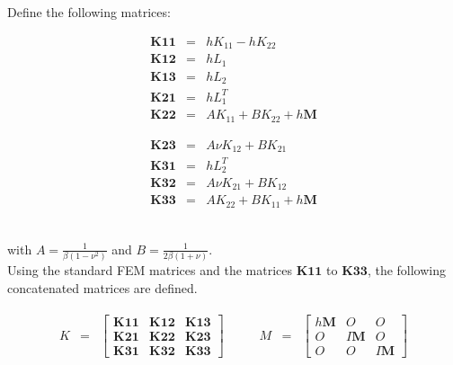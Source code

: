 \documentclass[../../main.tex]{subfiles}
\begin{document}
Define the following matrices:\\
\noindent\begin{minipage}{.5\linewidth}
	\begin{eqnarray*}
		\mathbf{K11} & = & hK_{11}-hK_{22}\\
		\mathbf{K12} & = & hL_1\\
		\mathbf{K13} & = & hL_2\\
		\mathbf{K21} & = & hL_1^T\\
		\mathbf{K22} & = & AK_{11}+BK_{22}+h\mathbf{M}
	\end{eqnarray*}
\end{minipage}%
\begin{minipage}{0.8\linewidth}
	\begin{eqnarray*}
		\mathbf{K23} & = & A\nu K_{12}+BK_{21}\\
		\mathbf{K31} & = & hL_2^T\\
		\mathbf{K32} & = & A\nu K_{21}+BK_{12}\\
		\mathbf{K33} & = & AK_{22}+BK_{11}+h\mathbf{M}
	\end{eqnarray*}
\end{minipage}\\

with $A = \frac{1}{\beta(1-\nu^2)}$ and $B = \frac{1}{2\beta(1+\nu)}$.\\

Using the standard FEM matrices and the matrices $\mathbf{K11}$ to $\mathbf{K33}$, the following concatenated matrices are defined.


\begin{eqnarray}
	\begin{aligned}
		K & = &
		\begin{bmatrix}
			\mathbf{K11} & \mathbf{K12} & \mathbf{K13}\\
			\mathbf{K21} & \mathbf{K22} & \mathbf{K23}\\
			\mathbf{K31} & \mathbf{K32} & \mathbf{K33}
		\end{bmatrix}
	\end{aligned}
	\ \ \ \ \ \ \ \ \
	\begin{aligned}
		M & = &
		\begin{bmatrix}
			h\mathbf{M} & {O} & {O}\\
			{O} & I\mathbf{M} & {O}\\
			{O} & {O} & I\mathbf{M}
		\end{bmatrix}\label{3DB_23}
	\end{aligned}\label{eq:PFEM:K+M}
\end{eqnarray}
\end{document}
